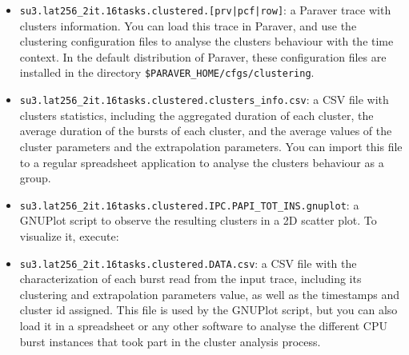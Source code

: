 \documentclass[twoside,a4,english,11pt]{book}
\begin{document}
\begin{itemize}

  \item \texttt{su3.lat256\_2it.16tasks.clustered.[prv|pcf|row]}: a Paraver
  trace with clusters information. You can load this trace in Paraver, and use
  the clustering configuration files to analyse the clusters behaviour with the
  time context. In the default distribution of Paraver, these configuration
  files are installed in the directory \texttt{\${PARAVER\_HOME}/cfgs/clustering}.
 
  \item \texttt{su3.lat256\_2it.16tasks.clustered.clusters\_info.csv}: a CSV file
  with clusters statistics, including the aggregated duration of each cluster,
  the average duration of the bursts of each cluster, and the average values of
  the cluster parameters and the extrapolation parameters. You can import this
  file to a regular spreadsheet application to analyse the clusters behaviour
  as a group.
 
  \item \texttt{su3.lat256\_2it.16tasks.clustered.IPC.PAPI\_TOT\_INS.gnuplot}: a
  GNUPlot script to observe the resulting clusters in a 2D scatter plot. To
  visualize it, execute:

  \begin{figure}[!h]
  

  \end{figure}

  \item \texttt{su3.lat256\_2it.16tasks.clustered.DATA.csv}: a CSV file with the 
  characterization of each burst read from the input trace, including its 
  clustering and extrapolation parameters value, as well as the timestamps and
  cluster id assigned. This file is used by the GNUPlot script, but you can
  also load it in a spreadsheet or any other software to analyse the different
  CPU burst instances that took part in the cluster analysis process.
 
\end{itemize}
\end{document}
